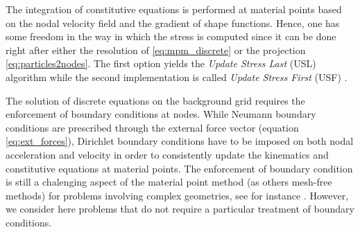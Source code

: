The integration of constitutive equations is performed at material points based on the nodal velocity field and the gradient of shape functions. Hence, one has some freedom in the way in which the stress is computed since it can be done right after either the resolution of \eqref{eq:mpm_discrete} or the projection \eqref{eq:particles2nodes}. The first option yields the \textit{Update Stress Last} (USL) algorithm while the second implementation is called \textit{Update Stress First} (USF) \cite{Bardenhagen_USF_USL}. 

The solution of discrete equations on the background grid requires the enforcement of boundary conditions at nodes. While Neumann boundary conditions are prescribed through the external force vector (equation \eqref{eq:ext_forces}), Dirichlet boundary conditions have to be imposed on both nodal acceleration and velocity in order to consistently update the kinematics and constitutive equations at material points. The enforcement of boundary condition is still a chalenging aspect of the material point method (as others mesh-free methods) for problems involving complex geometries, see for instance \cite{Bcs_MPM}. However, we consider here problems that do not require a particular treatment of boundary conditions.

